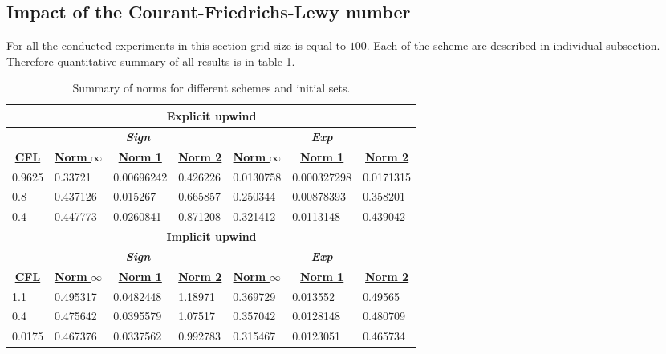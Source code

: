 \subsection{Impact of the Courant-Friedrichs-Lewy number} \label{sec:impactCFL}
	For all the conducted experiments in this section grid size is equal to $100$. Each of the scheme are described in individual subsection. Therefore quantitative summary of all results is in table \ref{tab:impactCFL}.
	
	
%	
%	
	
	\begin{table}[]
		\centering
		\caption{Summary of norms for different schemes and initial sets.}
		\label{tab:impactCFL}
				\begin{tabular}{|l|l|l|l|l|l|l|}
					\hline
					\multicolumn{7}{|c|}{\textbf{Explicit upwind}} \\ \hline
					& \multicolumn{3}{|c|}{\textit{\textbf{Sign}}} & \multicolumn{3}{|c|}{\textit{\textbf{Exp}}} \\ \hline
					\multicolumn{1}{|c|}{{\ul \textbf{CFL}}} & \multicolumn{1}{|c|}{{\ul \textbf{Norm }$\infty$}} & \multicolumn{1}{c}{{\ul \textbf{Norm 1}}} & \multicolumn{1}{|c|}{{\ul \textbf{Norm 2}}} & \multicolumn{1}{|c|}{{\ul \textbf{Norm }$\infty$}} & \multicolumn{1}{|c|}{{\ul \textbf{Norm 1}}} & \multicolumn{1}{|c|}{{\ul \textbf{Norm 2}}} \\ \hline \hline
					0.9625 & 0.33721 & 0.00696242 & 0.426226 & 0.0130758 & 0.000327298 & 0.0171315 \\ \hline
					0.8 & 0.437126 & 0.015267 & 0.665857 & 0.250344 & 0.00878393 & 0.358201 \\ \hline
					0.4 & 0.447773 & 0.0260841 & 0.871208 & 0.321412 & 0.0113148 & 0.439042 \\ \hline \hline
					
					\multicolumn{7}{|c|}{\textbf{Implicit upwind}} \\ \hline
					& \multicolumn{3}{|c|}{\textit{\textbf{Sign}}} & \multicolumn{3}{|c|}{\textit{\textbf{Exp}}} \\ \hline
					\multicolumn{1}{|c|}{{\ul \textbf{CFL}}} & \multicolumn{1}{|c|}{{\ul \textbf{Norm }$\infty$}} & \multicolumn{1}{|c|}{{\ul \textbf{Norm 1}}} & \multicolumn{1}{|c|}{{\ul \textbf{Norm 2}}} & \multicolumn{1}{|c|}{{\ul \textbf{Norm }$\infty$}} & \multicolumn{1}{|c|}{{\ul \textbf{Norm 1}}} & \multicolumn{1}{||c|}{{\ul \textbf{Norm 2}}} \\ \hline \hline
					1.1 & 0.495317 & 0.0482448 & 1.18971 & 0.369729 & 0.013552 & 0.49565 \\ \hline
					0.4 & 0.475642 & 0.0395579 & 1.07517 & 0.357042 & 0.0128148 & 0.480709 \\ \hline
					0.0175 & 0.467376 & 0.0337562 & 0.992783 & 0.315467 & 0.0123051 & 0.465734 \\ \hline \hline
					

\end{tabular}
\end{table}
